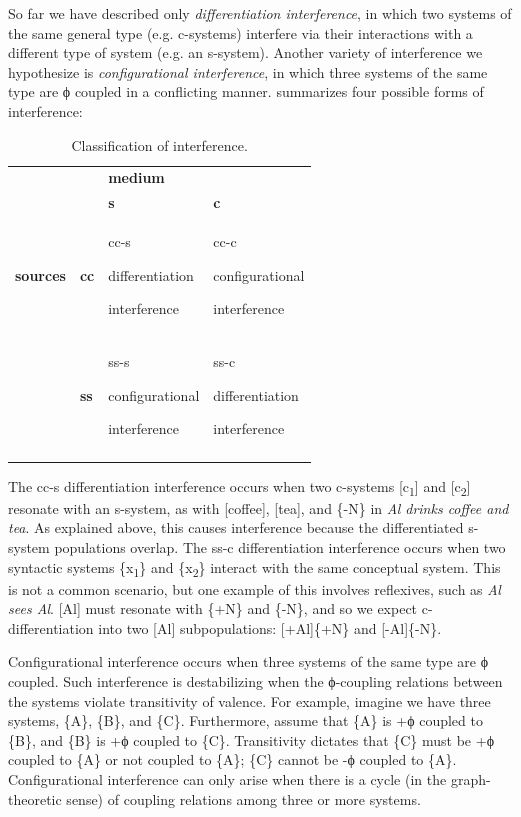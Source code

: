   So far we have described only \textit{differentiation interference}, in which two systems of the same general type (e.g. c-systems) interfere via their interactions with a different type of system (e.g. an s-system). Another variety of interference we hypothesize is \textit{configurational interference}, in which three systems of the same type are ϕ coupled in a conflicting manner. {} summarizes four possible forms of interference:

\begin{table}
\begin{tabularx}{\textwidth}{llXX} 
\lsptoprule
&  & \textbf{medium} & \\
&  & \textbf{s} & \textbf{c}\\
\midrule 
\textbf{sources} & \textbf{cc} & cc-s

differentiation 

interference & cc-c

configurational

interference\\
\tablevspace
& \textbf{ss} & ss-s

configurational

interference & ss-c

differentiation

interference\\
\lspbottomrule
\end{tabularx}
\caption{Classification of interference.}\label{tab:4:2}
\end{table}
  The cc-s differentiation interference occurs when two c-systems [c\textsubscript{1}] and [c\textsubscript{2}] resonate with an s-system, as with [coffee], [tea], and \{-N\} in \textit{Al drinks coffee and tea}. As explained above, this causes interference because the differentiated s-system populations overlap. The ss-c differentiation interference occurs when two syntactic systems \{x\textsubscript{1}\} and \{x\textsubscript{2}\} interact with the same conceptual system. This is not a common scenario, but one example of this involves reflexives, such as \textit{Al sees Al}. [Al] must resonate with \{+N\} and \{-N\}, and so we expect c-differentiation into two [Al] subpopulations: [+Al]\{+N\} and [-Al]\{-N\}.

  Configurational interference occurs when three systems of the same type are ϕ coupled. Such interference is destabilizing when the ϕ-coupling relations between the systems violate transitivity of valence. For example, imagine we have three systems, \{A\}, \{B\}, and \{C\}. Furthermore, assume that \{A\} is +ϕ coupled to \{B\}, and \{B\} is +ϕ coupled to \{C\}. Transitivity dictates that \{C\} must be +ϕ coupled to \{A\} or not coupled to \{A\}; \{C\} cannot be -ϕ coupled to \{A\}. Configurational interference can only arise when there is a cycle (in the graph-theoretic sense) of coupling relations among three or more systems. 

